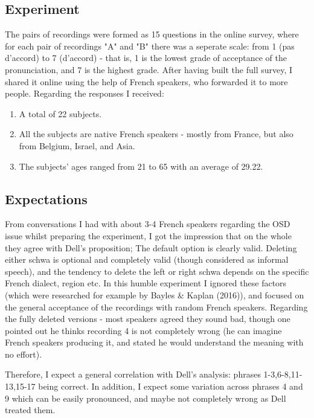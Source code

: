 \documentclass{article}
\begin{document}
\subsection{Experiment}
The pairs of recordings were formed as 15 questions in the online survey, where for each pair of recordings "A" and "B" there was a seperate scale: from 1 (pas d'accord) to 7 (d'accord) - that is, 1 is the lowest grade of acceptance of the pronunciation, and 7 is the highest grade. After having built the full survey,  I shared it online using the help of French speakers, who forwarded it to more people.  
Regarding the responses I received:
\begin{enumerate}
  \item A total of 22 subjects.
  \item All the subjects are native French speakers - mostly from France, but also from Belgium, Israel,  and Asia.
  \item The subjects’ ages ranged from 21 to 65 with an average of 29.22.
\end{enumerate}

\subsection{Expectations}
From conversations I had with about 3-4 French speakers regarding the OSD issue whilst preparing the experiment,  I got the impression that on the whole they agree with Dell's proposition; The default option is clearly valid. Deleting either schwa is optional and completely valid (though considered as informal speech), and the tendency to delete the left or right schwa depends on the specific French dialect, region etc. In this humble experiment I ignored these factors (which were researched for example by Bayles \& Kaplan (2016)), and focused on the general acceptance of the recordings with random French speakers. 
Regarding the fully deleted versions - most speakers agreed they sound bad, though one pointed out he thinks recording 4 is not completely wrong (he can imagine French speakers producing it, and stated he would understand the meaning with no effort). 

Therefore, I expect a general correlation with Dell's analysis: phrases 1-3,6-8,11-13,15-17 being correct. In addition, I expect some variation across phrases 4 and 9 which can be easily pronounced, and maybe not completely wrong as Dell treated them. 

\clearpage
\end{document}
